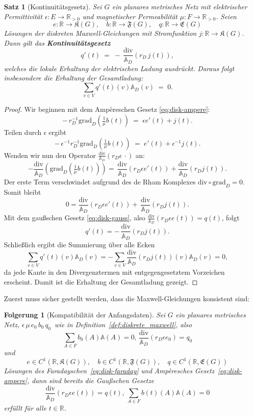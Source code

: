 \documentclass[11pt,a4paper,leqno]{report}
\newtheorem{proposition}{Satz}[chapter]
\newtheorem{corollary}[theorem]{Folgerung}
\numberwithin{equation}{chapter}
\begin{document}
\begin{proposition}[Kontinuitätsgesetz]
	Sei \(G\) ein planares metrisches Netz mit elektrischer Permittivität \( \epsilon: E \to \mathbb{R}_{>0}\) 
	und magnetischer Permeabilität \( \mu: F \to \mathbb{R}_{>0}\).  
	Seien 
	\[
	e : \mathbb{R} \to \mathfrak{K}(G), 
	\quad b : \mathbb{R} \to \mathfrak{F}(G), 
	\quad q : \mathbb{R} \to \mathfrak{E}(G)
	\]
	Lösungen der diskreten Maxwell-Gleichungen mit Stromfunktion \(j : \mathbb{R} \to \mathfrak{K}(G)\).  
	Dann gilt das \textbf{Kontinuitätsgesetz}
	\[
	q'(t) \;=\; -\,\frac{\mathrm{div}}{\mathbb{A}_D}(r_D \, j(t)),
	\]
	welches die lokale Erhaltung der elektrischen Ladung ausdrückt. Daraus folgt insbesondere die Erhaltung der Gesamtladung:
	\[
	\sum_{v\in V} q'(t)(v)\mathbb{A}_D(v) \;=\; 0.
	\]
\end{proposition}
\begin{proof}
	Wir beginnen mit dem Ampèreschen Gesetz \eqref{eq:disk-ampere}:
	\[
	-\, r_D^{-1}\mathrm{grad}_D\!\left(\tfrac{1}{\mu} b(t)\right) \;=\; \epsilon e'(t) + j(t).
	\]
	Teilen durch \(\epsilon\) ergibt
	\[
	-\, \epsilon^{-1}r_D^{-1}\mathrm{grad}_D\!\left(\tfrac{1}{\mu} b(t)\right) \;=\;  e'(t) + \epsilon^{-1}j(t).
	\]
	Wenden wir nun den Operator \(\frac{\mathrm{div}}{\mathbb{A}_D}(r_D\epsilon\,\cdot)\) an:
	\[
	-\frac{\mathrm{div}}{\mathbb{A}_D}(\mathrm{grad}_D\!\left(\tfrac{1}{\mu} b(t)\right)) 
	= \,\frac{\mathrm{div}}{\mathbb{A}_D}(r_D\epsilon e'(t)) + \frac{\mathrm{div}}{\mathbb{A}_D}(r_D j(t)).
	\]
	Der erste Term verschwindet aufgrund des de Rham Komplexes \(\mathrm{div}\circ \mathrm{grad}_D = 0\).  
	Somit bleibt
	\[
	0=\frac{\mathrm{div}}{\mathbb{A}_D}(r_D\epsilon e'(t)) +\,\frac{\mathrm{div}}{\mathbb{A}_D}(r_D j(t)).
	\]
	Mit dem gaußschen Gesetz \eqref{eq:disk-gauss}, also \(\frac{\mathrm{div}}{\mathbb{A}_D}(r_D\epsilon e(t))=q(t)\), folgt
	\[
	q'(t) = -\,\frac{\mathrm{div}}{\mathbb{A}_D}(r_D j(t)).
	\]
	Schließlich ergibt die Summierung über alle Ecken
	\[
	\sum_{v\in V} q'(t)(v)\mathbb{A}_D(v) = - \sum_{v\in V}\frac{\mathrm{div}}{\mathbb{A}_D}(r_D j(t))(v)\mathbb{A}_D(v) = 0,
	\]
	da jede Kante in den Divergenztermen mit entgegengesetztem Vorzeichen erscheint. Damit ist die Erhaltung der Gesamtladung gezeigt.
\end{proof}
\noindent
Zuerst muss sicher gestellt werden, dass die Maxwell-Gleichungen konsistent sind:
\begin{corollary}[Kompatibilität der Anfangsdaten]
	Sei \(G\) ein planares metrisches Netz, \(\epsilon\,\mu\, e_0\, b_0\, q_0\, \) wie in Definition~\ref{def:diskrete_maxwell}, also
	\[
	\sum_{A\in F} b_0(A)\mathbb{A}(A) =0, \,
	\frac{\mathrm{div}}{\mathbb{A}_D}(r_D\epsilon e_0) = q_0
	\]
	und
	\[
	e \in C^1(\mathbb{R},\mathfrak{K}(G)), 
	\quad b \in C^1(\mathbb{R},\mathfrak{F}(G)), 
	\quad q \in C^1(\mathbb{R},\mathfrak{E}(G))
	\]
	Lösungen des Faradayschen~\ref{eq:disk-faraday} und Ampèresches Gesetz~\ref{eq:disk-ampere}, dann sind bereits die Gaußschen Gesetze
	\[
	\frac{\mathrm{div}}{\mathbb{A}_D}(r_D\epsilon e(t)) = q(t), \, 
	\sum_{A\in F} b(t)(A)\mathbb{A}(A) = 0
	\]
	erfüllt für alle \(t\in\mathbb{R}\).
\end{corollary}
\end{document}
